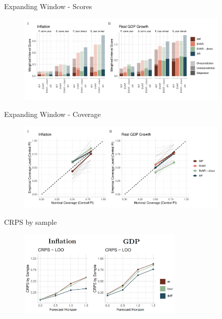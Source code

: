 \documentclass[en]{sdqbeamer}
\begin{document}
\begin{frame}{Expanding Window - Scores}
\label{extractionmethod}
\begin{figure}
        \centering
        \includegraphics[width=0.9\textwidth]{figures/wis_cpigdp_expandingwindow.pdf}
    \end{figure}
\end{frame}
\begin{frame}{Expanding Window - Coverage}
\begin{figure}
        \centering
        \includegraphics[width=0.9\textwidth]{figures/coverage_expandingwindow.pdf}
    \end{figure}
\end{frame}


\begin{frame}{CRPS by sample}
\label{samplecrps}
\begin{figure}
        \centering
        \includegraphics[width=0.7\textwidth]{figures/crpssample.png}
    \end{figure}
\end{frame}
\end{document}
